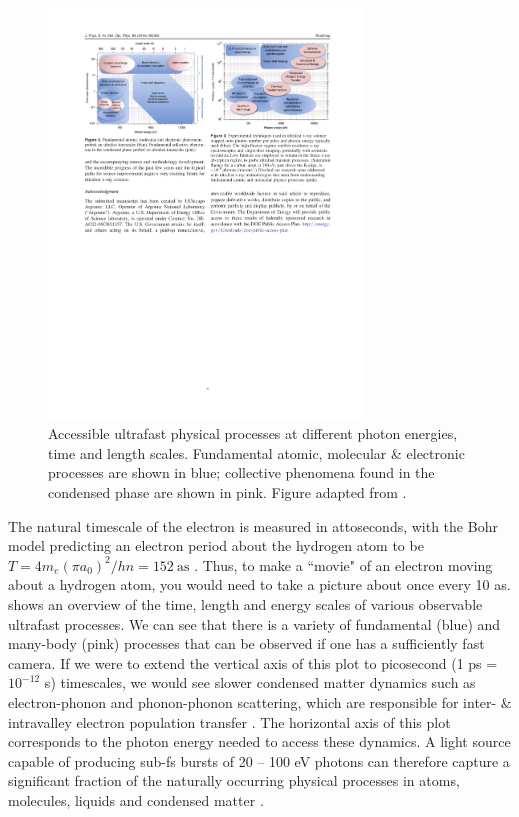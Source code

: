 \begin{figure}
	\centering
	\includegraphics[width=0.75\textwidth]{figures/chap1/physical_process_vs_duration_energy.pdf}
	\caption{Accessible ultrafast physical processes at different photon energies, time and length scales. Fundamental atomic, molecular \& electronic processes are shown in blue; collective phenomena found in the condensed phase are shown in pink. Figure adapted from \cite{youngRoadmapUltrafastXray2018}.}
	\label{fig:physical_process_vs_duration_energy}
\end{figure}

The natural timescale of the electron is measured in attoseconds, with the Bohr model predicting an electron period about the hydrogen atom to be ${T = 4 m_e (\pi a_0)^2 / h n = 152 \ \textrm{as}}$ \cite{changFundamentalsAttosecondOptics2011}. Thus, to make a ``movie" of an electron moving about a hydrogen atom, you would need to take a picture about once every 10 as.  shows an overview of the time, length and energy scales of various observable ultrafast processes. We can see that there is a variety of fundamental (blue) and many-body (pink) processes that can be observed if one has a sufficiently fast camera. If we were to extend the vertical axis of this plot to picosecond ({1 ps = $10^{-12}$ s}) timescales, we would see slower condensed matter dynamics such as electron-phonon and phonon-phonon scattering, which are responsible for inter- \& intravalley electron population transfer \cite{zurchDirectSimultaneousObservation2017}. The horizontal axis of this plot corresponds to the photon energy needed to access these dynamics. A light source capable of producing sub-fs bursts of 20 -- 100 eV photons can therefore capture a significant fraction of the naturally occurring physical processes in atoms, molecules, liquids and condensed matter \cite{piconAttosecondXrayTransient2019}.


